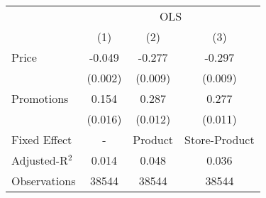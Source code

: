 \begin{tabular}{l*{3}{c}}
\hline\hline
                    &\multicolumn{3}{c}{OLS}               \\\cmidrule(lr){2-4}
                    &\multicolumn{1}{c}{(1)}&\multicolumn{1}{c}{(2)}&\multicolumn{1}{c}{(3)}\\
\hline
Price               &      -0.049&      -0.277&      -0.297\\
                    &     (0.002)&     (0.009)&     (0.009)\\
[1em]
Promotions          &       0.154&       0.287&       0.277\\
                    &     (0.016)&     (0.012)&     (0.011)\\
\hline
Fixed Effect        &           -&     Product&Store-Product\\
Adjusted-R$^2$      &       0.014&       0.048&       0.036\\
Observations        &       38544&       38544&       38544\\
\hline\hline
\end{tabular}
